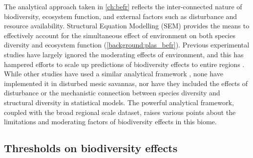 \begin{refsection}
The analytical approach taken in \autoref{ch:befr} reflects the inter-connected nature of biodiversity, ecosystem function, and external factors such as disturbance and resource availability. Structural Equation Modelling (SEM) provides the means to effectively account for the simultaneous effect of environment on both species diversity and ecosystem function (\autoref{background:plas_befr}). Previous experimental studies have largely ignored the moderating effects of environment, and this has hampered efforts to scale up predictions of biodiversity effects to entire regions \citep{Thompson2021}. While other studies have used a similar analytical framework \citep{Poorter2015, Poorter2017}, none have implemented it in disturbed mesic savannas, nor have they included the effects of disturbance or the mechanistic connection between species diversity and structural diversity in statistical models. The powerful analytical framework, coupled with the broad regional scale dataset, raises various points about the limitations and moderating factors of biodiversity effects in this biome.


\subsection{Thresholds on biodiversity effects}
\label{discussion:ssec:thresholds}


\end{refsection}
